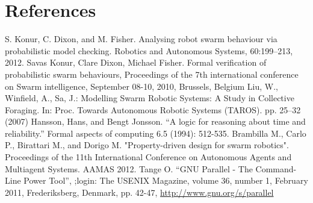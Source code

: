 \documentclass[11pt]{article}
\theoremstyle{definition}
\begin{document}
% 

\section{References}

\begin{thebibliography}{99}
        S. Konur, C. Dixon, and M. Fisher.
        Analysing robot swarm behaviour via probabilistic model checking.
        Robotics and Autonomous Systems, 60:199–213,
        2012.
        Savas Konur, Clare Dixon, Michael Fisher.
        Formal verification of probabilistic swarm behaviours,
        Proceedings of the 7th international conference on Swarm intelligence,
        September 08-10, 2010, Brussels, Belgium
        Liu, W., Winfield, A., Sa, J.:
        Modelling Swarm Robotic Systems: A Study in Collective Foraging.
        In: Proc. Towards Autonomous Robotic Systems (TAROS).
        pp. 25–32 (2007)
        Hansson, Hans, and Bengt Jonsson.
        ``A logic for reasoning about time and reliability.''
        Formal aspects of computing 6.5 (1994): 512-535.
        Brambilla M., Carlo P., Birattari M., and Dorigo M.
        "Property-driven design for swarm robotics".
        Proceedings of the 11th International Conference on
        Autonomous Agents and Multiagent Systems.
        AAMAS 2012.
        Tange O.
        ``GNU Parallel - The Command-Line Power Tool'',
        ;login: The USENIX Magazine,
        volume 36, number 1, February 2011,
        Frederiksberg, Denmark,
        pp. 42-47,
        \url{http://www.gnu.org/s/parallel}
\end{thebibliography}
\end{document}

